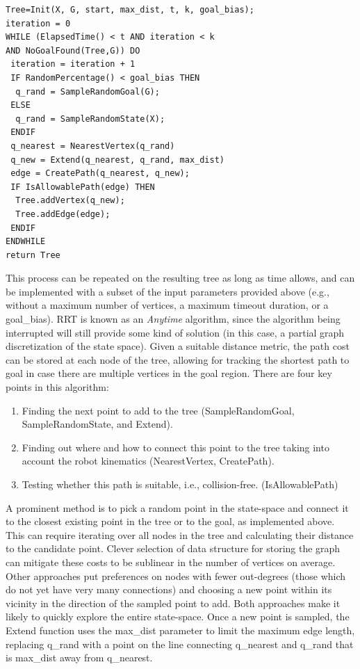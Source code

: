 \begin{verbatim}
Tree=Init(X, G, start, max_dist, t, k, goal_bias);
iteration = 0
WHILE (ElapsedTime() < t AND iteration < k 
AND NoGoalFound(Tree,G)) DO
 iteration = iteration + 1
 IF RandomPercentage() < goal_bias THEN
  q_rand = SampleRandomGoal(G);
 ELSE
  q_rand = SampleRandomState(X);
 ENDIF
 q_nearest = NearestVertex(q_rand)
 q_new = Extend(q_nearest, q_rand, max_dist)
 edge = CreatePath(q_nearest, q_new);
 IF IsAllowablePath(edge) THEN
  Tree.addVertex(q_new);
  Tree.addEdge(edge);
 ENDIF
ENDWHILE
return Tree
\end{verbatim}

This process can be repeated on the resulting tree as long as time allows, and can be implemented with a subset of the input parameters provided above (e.g., without a maximum number of vertices, a maximum timeout duration, or a goal\_bias). RRT is known as an  \textsl{Anytime} algorithm, since the algorithm being interrupted will still provide some kind of solution (in this case, a partial graph discretization of the state space). Given a suitable distance metric, the path cost can be stored at each node of the tree, allowing for tracking the shortest path to goal in case there are multiple vertices in the goal region.
There are four key points in this algorithm:

\begin{enumerate}
    \item Finding the next point to add to the tree (SampleRandomGoal, SampleRandomState, and Extend).
    \item Finding out where and how to connect this point to the tree taking into account the robot kinematics (NearestVertex, CreatePath).
    \item Testing whether this path is suitable, i.e., collision-free. (IsAllowablePath)
\end{enumerate}

A prominent method is to pick a random point in the state-space and connect it to the closest existing point in the tree or to the goal, as implemented above. This can require iterating over all nodes in the tree and calculating their distance to the candidate point. Clever selection of data structure for storing the graph can mitigate these costs to be sublinear in the number of vertices on average. Other approaches put preferences on nodes with fewer out-degrees (those which do not yet have very many connections) and choosing a new point within its vicinity in the direction of the sampled point to add. Both approaches make it likely to quickly explore the entire state-space. Once a new point is sampled, the Extend function uses the max\_dist parameter to limit the maximum edge length, replacing q\_rand with a point on the line connecting q\_nearest and q\_rand that is max\_dist away from q\_nearest.

